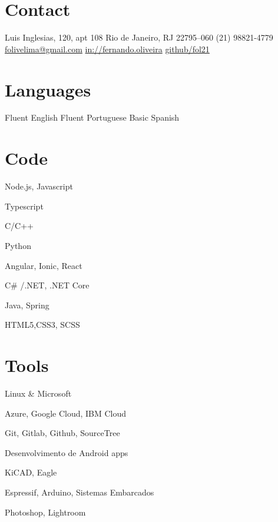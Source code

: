 \documentclass[]{friggeri-cv} %
\begin{document}


\vspace{1cm}

 
\begin{aside} %
\section{Contact}
Luis Inglesias, 120, apt 108
Rio de Janeiro, RJ
22795--060
(21) 98821-4779
\href{mailto:folivelima@gmail.com}{folivelima@gmail.com}
\href{https://www.linkedin.com/in/fernando-lima-47673263/}{in://fernando.oliveira}
\href{https://github.com/fol21}{github/fol21}
\section{Languages}
Fluent English
Fluent Portuguese
Basic Spanish
\section{Code}
\item Node.js, Javascript
\item Typescript
\item C/C++
\item Python
\item Angular, Ionic, React
\item C\# /.NET, .NET Core
\item Java, Spring
\item HTML5,CSS3, SCSS
\section{Tools}
\item Linux \& Microsoft
\item Azure, Google Cloud, IBM Cloud
\item Git, Gitlab, Github, SourceTree
\item Desenvolvimento de Android apps
\item KiCAD, Eagle
\item Espressif, Arduino, Sistemas Embarcados
\item Photoshop, Lightroom
\end{aside}
\end{document}
